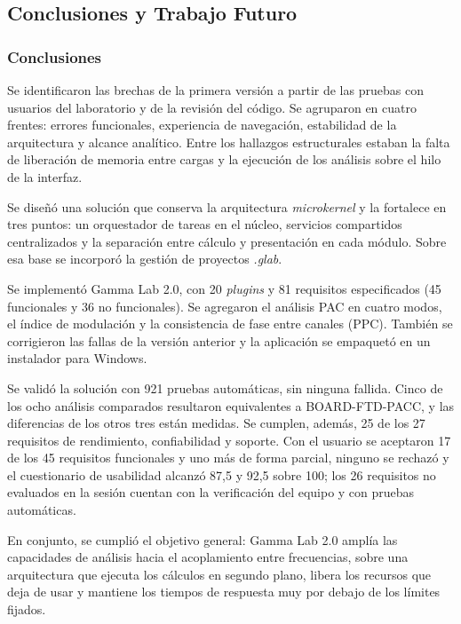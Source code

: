 \documentclass[12pt,letterpaper,oneside]{article}
\begin{document}
\subsection{Conclusiones y Trabajo Futuro}

\subsubsection{Conclusiones}

Se identificaron las brechas de la primera versión a partir de las pruebas con usuarios del laboratorio y de la revisión del código. Se agruparon en cuatro frentes: errores funcionales, experiencia de navegación, estabilidad de la arquitectura y alcance analítico. Entre los hallazgos estructurales estaban la falta de liberación de memoria entre cargas y la ejecución de los análisis sobre el hilo de la interfaz.

Se diseñó una solución que conserva la arquitectura \textit{microkernel} y la fortalece en tres puntos: un orquestador de tareas en el núcleo, servicios compartidos centralizados y la separación entre cálculo y presentación en cada módulo. Sobre esa base se incorporó la gestión de proyectos \textit{.glab}.

Se implementó Gamma Lab 2.0, con 20 \textit{plugins} y 81 requisitos especificados (45 funcionales y 36 no funcionales). Se agregaron el análisis PAC en cuatro modos, el índice de modulación y la consistencia de fase entre canales (PPC). También se corrigieron las fallas de la versión anterior y la aplicación se empaquetó en un instalador para Windows.

Se validó la solución con 921 pruebas automáticas, sin ninguna fallida. Cinco de los ocho análisis comparados resultaron equivalentes a BOARD-FTD-PACC, y las diferencias de los otros tres están medidas. Se cumplen, además, 25 de los 27 requisitos de rendimiento, confiabilidad y soporte. Con el usuario se aceptaron 17 de los 45 requisitos funcionales y uno más de forma parcial, ninguno se rechazó y el cuestionario de usabilidad alcanzó 87,5 y 92,5 sobre 100; los 26 requisitos no evaluados en la sesión cuentan con la verificación del equipo y con pruebas automáticas.

En conjunto, se cumplió el objetivo general: Gamma Lab 2.0 amplía las capacidades de análisis hacia el acoplamiento entre frecuencias, sobre una arquitectura que ejecuta los cálculos en segundo plano, libera los recursos que deja de usar y mantiene los tiempos de respuesta muy por debajo de los límites fijados.
\end{document}
